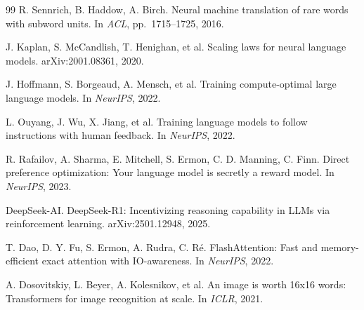 \documentclass[11pt,a4paper]{article}
\begin{document}
\begin{thebibliography}{99}
 R. Sennrich, B. Haddow, A. Birch.
Neural machine translation of rare words with subword units.
In \emph{ACL}, pp.~1715--1725, 2016.

 J. Kaplan, S. McCandlish, T. Henighan, et al.
Scaling laws for neural language models.
arXiv:2001.08361, 2020.

 J. Hoffmann, S. Borgeaud, A. Mensch, et al.
Training compute-optimal large language models.
In \emph{NeurIPS}, 2022.

 L. Ouyang, J. Wu, X. Jiang, et al.
Training language models to follow instructions with human feedback.
In \emph{NeurIPS}, 2022.

 R. Rafailov, A. Sharma, E. Mitchell, S. Ermon, C. D. Manning, C. Finn.
Direct preference optimization: Your language model is secretly a reward model.
In \emph{NeurIPS}, 2023.

 DeepSeek-AI.
DeepSeek-R1: Incentivizing reasoning capability in LLMs via reinforcement learning.
arXiv:2501.12948, 2025.

 T. Dao, D. Y. Fu, S. Ermon, A. Rudra, C. R\'e.
FlashAttention: Fast and memory-efficient exact attention with IO-awareness.
In \emph{NeurIPS}, 2022.

 A. Dosovitskiy, L. Beyer, A. Kolesnikov, et al.
An image is worth 16x16 words: Transformers for image recognition at scale.
In \emph{ICLR}, 2021.

\end{thebibliography}
\endgroup
\end{document}
